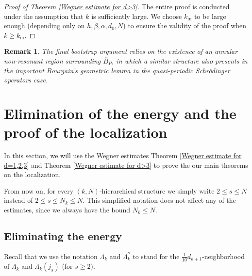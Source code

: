 \documentclass[11pt,reqno,UTF8,twoside]{amsart}
\newcommand{\barB}{\overline{B}}
\newtheorem{rmk}{\bf Remark}[section]
\theoremstyle{definition}
\numberwithin{equation}{section}
\begin{document}
\begin{proof}[Proof of Theorem \ref{Wegner estimate for d>3}]
The entire proof is conducted under the assumption that $k$ is sufficiently large. We choose $k_{\text{in}}$ to be large enough (depending only on $h,\beta,\alpha,d_0,N$) to ensure the validity of the proof when $k\geq k_{\text{in}}$.

\end{proof}

\begin{rmk}
The final bootstrap argument relies on the existence of an annular non-resonant region surrounding $\barB_P$, in which  a similar structure also presents in  the important Bourgain's geometric lemma  \cite{Bou07} in the quasi-periodic Schr\"odinger operators case.
\end{rmk}



\section{Elimination of the energy and the proof of the localization}\label{section eliminate the energy}
In this section, we will use the Wegner estimates Theorem \ref{Wegner estimate for d=1,2,3} and Theorem \ref{Wegner estimate for d>3} to prove the our main theorems on the localization. %


From now on, for every $(k,N)$-hierarchical structure we simply write $2\leq s\leq N$ instead of $2\leq s\leq N_k\leq N$. This simplified  notation does not affect any of the estimates, since we always have the bound $ N_k \leq N$.

\subsection{Eliminating  the energy}
Recall that we use the notation $\overline{\Lambda}_k$ and $\overline{\Lambda}_{k}^s$ to stand for the $\frac{1}{10}d_{k+1}$-neighborhood of $\Lambda_k$ and $\Lambda_k(j_s)$ (for $s\geq 2$). 
\end{document}
